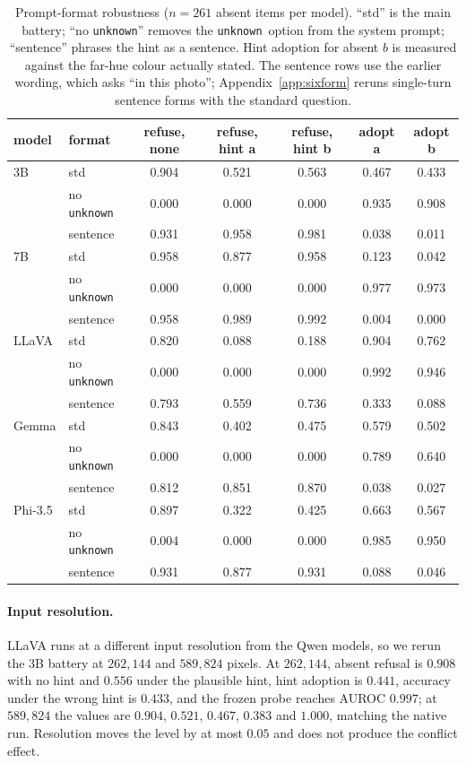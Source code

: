 \documentclass[10pt]{article}
\newcommand{\unknown}{\texttt{unknown}}
\begin{document}
\begin{table}[h]
\centering
\small
\caption{Prompt-format robustness ($n=261$ absent items per model). ``std'' is the main battery; ``no \unknown'' removes the \unknown\ option from the system prompt; ``sentence'' phrases the hint as a sentence. Hint adoption for absent $b$ is measured against the far-hue colour actually stated. The sentence rows use the earlier wording, which asks ``in this photo''; Appendix~\ref{app:sixform} reruns single-turn sentence forms with the standard question.}
\label{tab:promptfmt}
\begin{tabular}{llccccc}
\toprule
model & format & refuse, none & refuse, hint a & refuse, hint b & adopt a & adopt b \\
\midrule
3B & std & 0.904 & 0.521 & 0.563 & 0.467 & 0.433 \\
   & no \unknown & 0.000 & 0.000 & 0.000 & 0.935 & 0.908 \\
   & sentence & 0.931 & 0.958 & 0.981 & 0.038 & 0.011 \\
\midrule
7B & std & 0.958 & 0.877 & 0.958 & 0.123 & 0.042 \\
   & no \unknown & 0.000 & 0.000 & 0.000 & 0.977 & 0.973 \\
   & sentence & 0.958 & 0.989 & 0.992 & 0.004 & 0.000 \\
\midrule
LLaVA & std & 0.820 & 0.088 & 0.188 & 0.904 & 0.762 \\
      & no \unknown & 0.000 & 0.000 & 0.000 & 0.992 & 0.946 \\
      & sentence & 0.793 & 0.559 & 0.736 & 0.333 & 0.088 \\
\midrule
Gemma & std & 0.843 & 0.402 & 0.475 & 0.579 & 0.502 \\
      & no \unknown & 0.000 & 0.000 & 0.000 & 0.789 & 0.640 \\
      & sentence & 0.812 & 0.851 & 0.870 & 0.038 & 0.027 \\
\midrule
Phi-3.5 & std & 0.897 & 0.322 & 0.425 & 0.663 & 0.567 \\
        & no \unknown & 0.004 & 0.000 & 0.000 & 0.985 & 0.950 \\
        & sentence & 0.931 & 0.877 & 0.931 & 0.088 & 0.046 \\
\bottomrule
\end{tabular}
\end{table}

\paragraph{Input resolution.}
LLaVA runs at a different input resolution from the Qwen models, so we rerun the 3B battery at $262{,}144$ and $589{,}824$ pixels. At $262{,}144$, absent refusal is $0.908$ with no hint and $0.556$ under the plausible hint, hint adoption is $0.441$, accuracy under the wrong hint is $0.433$, and the frozen probe reaches AUROC $0.997$; at $589{,}824$ the values are $0.904$, $0.521$, $0.467$, $0.383$ and $1.000$, matching the native run. Resolution moves the level by at most $0.05$ and does not produce the conflict effect.
\end{document}
